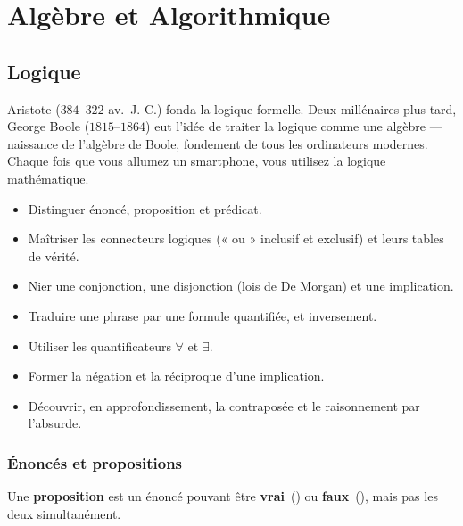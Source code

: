 \part{Alg\`ebre et Algorithmique}

\chapter{Logique}
\label{chap:logique}


\begin{anecdote}
Aristote ($384$--$322$ av.\ J.-C.) fonda la logique formelle. Deux mill\'enaires plus
tard, George Boole ($1815$--$1864$) eut l'id\'ee de traiter la logique comme une
alg\`ebre --- naissance de l'alg\`ebre de Boole, fondement de tous les ordinateurs
modernes. Chaque fois que vous allumez un smartphone, vous utilisez la logique
math\'ematique.
\end{anecdote}

\begin{objectifs}
\begin{itemize}
  \item Distinguer \'enonc\'e, proposition et pr\'edicat.
  \item Ma\^itriser les connecteurs logiques (« ou » inclusif et exclusif) et leurs tables de v\'erit\'e.
  \item Nier une conjonction, une disjonction (lois de De Morgan) et une implication.
  \item Traduire une phrase par une formule quantifi\'ee, et inversement.
  \item Utiliser les quantificateurs $\forall$ et $\exists$.
  \item Former la n\'egation et la r\'eciproque d'une implication.
  \item D\'ecouvrir, en approfondissement, la contrapos\'ee et le raisonnement par l'absurde.
\end{itemize}
\end{objectifs}

\section{\'Enonc\'es et propositions}

\begin{defn}[Proposition]
Une \textbf{proposition} est un \'enonc\'e pouvant \^etre \textbf{vrai}~(\vrai)
ou \textbf{faux}~(\faux), mais pas les deux simultan\'ement.
\end{defn}

